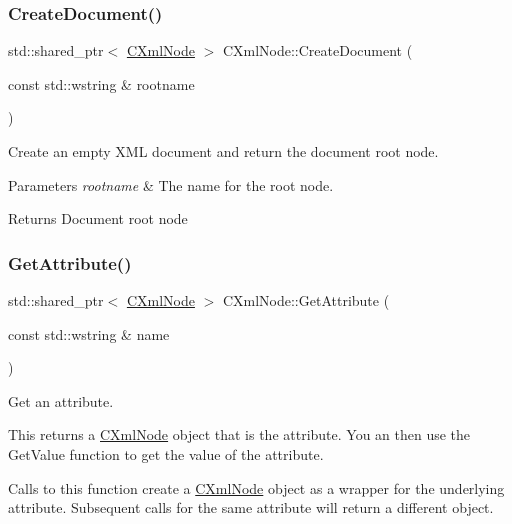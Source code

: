 \subsubsection{\texorpdfstring{Create\+Document()}{CreateDocument()}}
{\footnotesize\ttfamily std\+::shared\+\_\+ptr$<$ \mbox{\hyperlink{classxmlnode_1_1_c_xml_node}{C\+Xml\+Node}} $>$ C\+Xml\+Node\+::\+Create\+Document (\begin{DoxyParamCaption}\item[{const std\+::wstring \&}]{rootname }\end{DoxyParamCaption})\hspace{0.3cm}{\ttfamily [static]}}



Create an empty X\+ML document and return the document root node. 


\begin{DoxyParams}{Parameters}
{\em rootname} & The name for the root node. \\
\hline
\end{DoxyParams}
\begin{DoxyReturn}{Returns}
Document root node 
\end{DoxyReturn}
\mbox{\label{classxmlnode_1_1_c_xml_node_aa571e6a48132a260420a077dde31168f}} 
\subsubsection{\texorpdfstring{Get\+Attribute()}{GetAttribute()}}
{\footnotesize\ttfamily std\+::shared\+\_\+ptr$<$ \mbox{\hyperlink{classxmlnode_1_1_c_xml_node}{C\+Xml\+Node}} $>$ C\+Xml\+Node\+::\+Get\+Attribute (\begin{DoxyParamCaption}\item[{const std\+::wstring \&}]{name }\end{DoxyParamCaption})}



Get an attribute. 

This returns a \mbox{\hyperlink{classxmlnode_1_1_c_xml_node}{C\+Xml\+Node}} object that is the attribute. You an then use the Get\+Value function to get the value of the attribute.

Calls to this function create a \mbox{\hyperlink{classxmlnode_1_1_c_xml_node}{C\+Xml\+Node}} object as a wrapper for the underlying attribute. Subsequent calls for the same attribute will return a different object.


